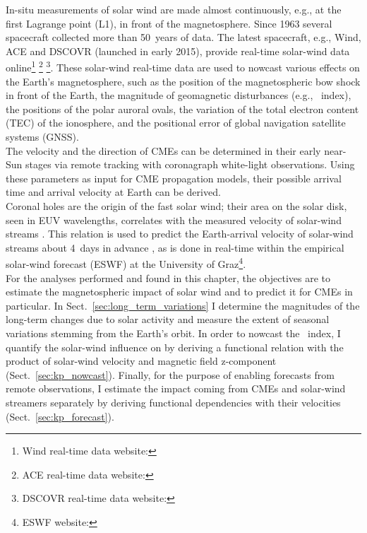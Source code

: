 In-situ measurements of solar wind are made almost continuously, e.g., at the first Lagrange point (L1), in front of the magnetosphere. Since 1963 several spacecraft collected more than 50~years of data. The latest spacecraft, e.g., Wind, ACE and DSCOVR (launched in early 2015), provide real-time solar-wind data online\footnote{Wind real-time data website: } \footnote{ACE real-time data website: } \footnote{DSCOVR real-time data website: }.
These solar-wind real-time data are used to nowcast various effects on the Earth's magnetosphere, such as the position of the magnetospheric bow shock in front of the Earth, the magnitude of geomagnetic disturbances (e.g., \Kp~index), the positions of the polar auroral ovals, the variation of the total electron content (TEC) of the ionosphere, and the positional error of global navigation satellite systems (GNSS).\\


The velocity and the direction of CMEs can be determined in their early near-Sun stages via remote tracking with coronagraph white-light observations. Using these parameters as input for CME propagation models, their possible arrival time and arrival velocity at Earth can be derived.\\

Coronal holes are the origin of the fast solar wind; their area on the solar disk, seen in EUV wavelengths, correlates with the measured velocity of solar-wind streams \citep{Vrsnak2007}. This relation is used to predict the Earth-arrival velocity of solar-wind streams about 4~days in advance \citep{Rotter2012}, as is done in real-time within the empirical solar-wind forecast (ESWF) at the University of Graz\footnote{ESWF website: }.\\

For the analyses performed and found in this chapter, the objectives are to estimate the magnetospheric impact of solar wind and to predict it for CMEs in particular. In Sect.~\ref{sec:long_term_variations} I determine the magnitudes of the long-term \Kp{} changes due to solar activity and measure the extent of seasonal variations stemming from the Earth's orbit. In order to nowcast the \Kp{}~index, I quantify the solar-wind influence on \Kp{} by deriving a functional relation with the product of solar-wind velocity and magnetic field z-component (Sect.~\ref{sec:kp_nowcast}). Finally, for the purpose of enabling \Kp{} forecasts from remote observations, I estimate the \Kp{} impact coming from CMEs and solar-wind streamers separately by deriving functional dependencies with their velocities (Sect.~\ref{sec:kp_forecast}).


